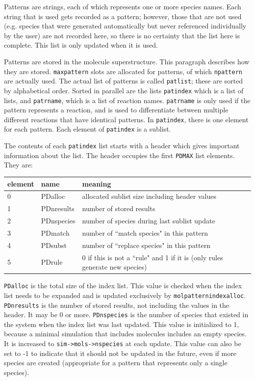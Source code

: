 \documentclass {scrbook}
\newcommand {\ttt} {\texttt}
\begin{document}
Patterns are strings, each of which represents one or more species names. Each string that is used gets recorded as a pattern; however, those that are not used (e.g. species that were generated automatically but never referenced individually by the user) are not recorded here, so there is no certainty that the list here is complete. This list is only updated when it is used.

Patterns are stored in the molecule superstructure. This paragraph describes how they are stored. \ttt{maxpattern} slots are allocated for patterns, of which \ttt{npattern} are actually used. The actual list of patterns is called \ttt{patlist}; these are sorted by alphabetical order. Sorted in parallel are the lists \ttt{patindex} which is a list of lists, and \ttt{patrname}, which is a list of reaction names. \ttt{patrname} is only used if the pattern represents a reaction, and is used to differentiate between multiple different reactions that have identical patterns. In \ttt{patindex}, there is one element for each pattern. Each element of \ttt{patindex} is a sublist.

The contents of each \ttt{patindex} list starts with a header which gives important information about the list. The header occupies the first \ttt{PDMAX} list elements. They are:

\begin{longtable}[c]{lll}
element & name & meaning\\
\hline
0 & PDalloc & allocated sublist size including header values\\
1 & PDnresults & number of stored results\\
2 & PDnspecies & number of species during last sublist update\\
3 & PDmatch & number of ``match species" in this pattern\\
4 & PDsubst & number of ``replace species" in this pattern\\
5 & PDrule & 0 if this is not a ``rule" and 1 if it is (only rules generate new species)
\end{longtable}

\ttt{PDalloc} is the total size of the index list. This value is checked when the index list needs to be expanded and is updated exclusively by \ttt{molpatternindexalloc}. \ttt{PDnresults} is the number of stored results, not including the values in the header. It may be 0 or more. \ttt{PDnspecies} is the number of species that existed in the system when the index list was last updated. This value is initialized to 1, because a minimal simulation that includes molecules includes an empty species. It is increased to \ttt{sim->mols->nspecies} at each update. This value can also be set to -1 to indicate that it should not be updated in the future, even if more species are created (appropriate for a pattern that represents only a single species).
\end{document}
